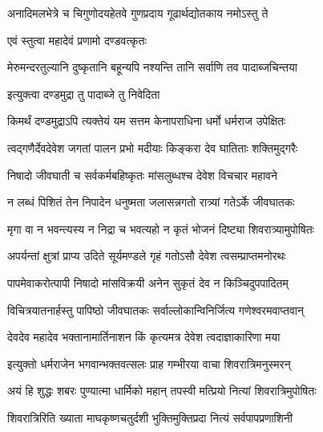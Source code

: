 \twolineshloka
{अनादिमलभेत्रे च चिगुणोदयहेतवे}
{गुणप्रदाय गूढार्थद्योतकाय नमोऽस्तु ते} %


\onelineshloka
{एवं स्तुत्वा महादेवं प्रणामो दण्डवत्कृतः} %


\twolineshloka
{मेरुमन्दरतुल्यानि दुष्कृतानि बहून्यपि}
{नश्यन्ति तानि सर्वाणि तव पादाब्जचिन्तया} %


\onelineshloka
{इत्युक्त्वा दण्डमुद्रा तु पादाब्जे तु निवेदिता} %


\twolineshloka
{किमर्थं दण्डमुद्राऽपि त्यक्तेयं यम सत्तम}
{केनापराधिना धर्मो धर्मराज उपेक्षितः} %


\twolineshloka
{त्वद्गणैर्देवदेवेश जगतां पालन प्रभो}
{मदीयाः किङ्करा देव घातिताः शक्तिमुद्गरैः} %

\twolineshloka
{निषादो जीवघाती च सर्वकर्मबहिष्कृतः}
{मांसलुब्धश्च देवेश विचचार महावने} %

\twolineshloka
{न लब्धं पिशितं तेन निपादेन धनुष्मता}
{जलासन्नगतो रात्र्यां गतेऽर्के जीवघातकः} %

\twolineshloka
{मृगा वा न भवन्त्यस्य न निद्रा च भवत्यहो}
{न कृतं भोजनं दिष्ट्या शिवरात्र्यामुपोषितः} %

\twolineshloka
{अपर्यन्तां क्षुत्रां प्राप्य उदिते सूर्यमण्डले}
{गृहं गतोऽसौ देवेश त्वसम्प्राप्तमनोरथः} %

\twolineshloka
{पापमेवाकरोत्पापी निषादो मांसविक्रयी}
{अनेन सुकृतं देव न किञ्चिदुपपादितम्} %

\twolineshloka
{विचित्रयातनार्हस्तु पापिष्ठो जीवघातकः}
{सर्वाल्लोकान्विनिर्जित्य गणेश्वरमवाप्तवान्} %

\twolineshloka
{देवदेव महादेव भक्तानामार्तिनाशन}
{किं कृत्यमत्र देवेश त्वदाज्ञाकारिणा मया} %


\twolineshloka
{इत्युक्तो धर्मराजेन भगवान्भक्तवत्सलः}
{प्राह गम्भीरया वाचा शिवरात्रिमनुस्मरन्} %


\twolineshloka
{अयं हि शुद्धः शबरः पुण्यात्मा धार्मिको महान्}
{तपस्वी मत्प्रियो नित्यां शिवरात्रिमुपोषितः} %

\twolineshloka
{शिवरात्रिरिति ख्याता माघकृष्णचतुर्दशी}
{भुक्तिमुक्तिप्रदा नित्यं सर्वपापप्रणाशिनी} %

